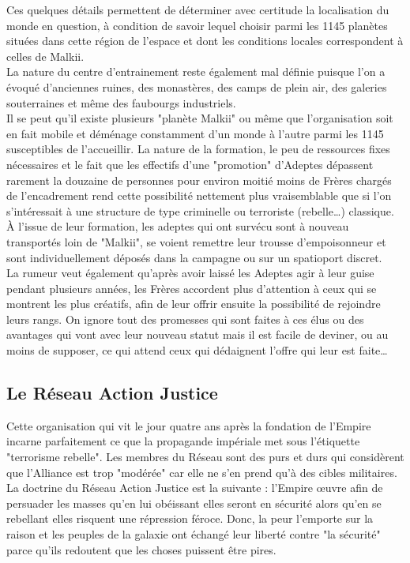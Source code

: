 \documentclass[twoside]{article}
\begin{document}
Ces quelques détails permettent de déterminer avec certitude la localisation du monde en question, à condition de savoir lequel choisir parmi les 1145 planètes situées dans cette région de l'espace et dont les conditions locales correspondent à celles de Malkii.\\

La nature du centre d'entrainement reste également mal définie puisque l'on a évoqué d'anciennes ruines, des monastères, des camps de plein air, des galeries souterraines et même des faubourgs industriels.\\
Il se peut qu'il existe plusieurs "planète Malkii" ou même que l'organisation soit en fait mobile et déménage constamment d'un monde à l'autre parmi les 1145 susceptibles de l'accueillir. La nature de la formation, le peu de ressources fixes nécessaires et le fait que les effectifs d'une "promotion" d'Adeptes dépassent rarement la douzaine de personnes pour environ moitié moins de Frères chargés de l'encadrement rend cette possibilité nettement plus vraisemblable que si l'on s'intéressait à une structure de type criminelle ou terroriste (rebelle\ldots) classique.\\

À l'issue de leur formation, les adeptes qui ont survécu sont à nouveau transportés loin de "Malkii", se voient remettre leur trousse d'empoisonneur et sont individuellement déposés dans la campagne ou sur un spatioport discret.\\

La rumeur veut également qu'après avoir laissé les Adeptes agir à leur guise pendant plusieurs années, les Frères accordent plus d'attention à ceux qui se montrent les plus créatifs, afin de leur offrir ensuite la possibilité de rejoindre leurs rangs. On ignore tout des promesses qui sont faites à ces élus ou des avantages qui vont avec leur nouveau statut mais il est facile de deviner, ou au moins de supposer, ce qui attend ceux qui dédaignent l'offre qui leur est faite\ldots

\subsection{Le Réseau Action Justice}
Cette organisation qui vit le jour quatre ans après la fondation de l'Empire incarne parfaitement ce que la propagande impériale met sous l'étiquette "terrorisme rebelle". Les membres du Réseau sont des purs et durs qui considèrent que l'Alliance est trop "modérée" car elle ne s'en prend qu'à des cibles militaires.
La doctrine du Réseau Action Justice est la suivante : l'Empire œuvre afin de persuader les masses qu'en lui obéissant elles seront en sécurité alors qu'en se rebellant elles risquent une répression féroce. Donc, la peur l'emporte sur la raison et les peuples de la galaxie ont échangé leur liberté contre "la sécurité" parce qu'ils redoutent que les choses puissent être pires.\\
\end{document}
